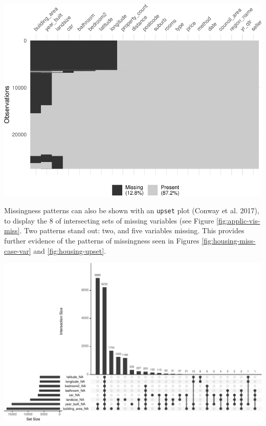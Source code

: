 \documentclass[]{article}
\let\origfigure\figure
\let\endorigfigure\endfigure
\renewenvironment{figure}[1][2] {
    \expandafter\origfigure\expandafter[H]
} {
    \endorigfigure
}
\theoremstyle{definition}
\theoremstyle{definition}
\theoremstyle{definition}
\theoremstyle{remark}
\begin{document}
\begin{figure}

{\centering \includegraphics[width=0.85\linewidth]{tidy-missing-data-paper_files/figure-latex/applic-vis-miss-1} 

}

\caption{Heatmap of clustered missingness for the housing data. Three groups of missingness are apparent, at the top for building area to longitude, the middle for building area and year built, at the end for building area, year built, and landsize. There is some structure in the missings.}\label{fig:applic-vis-miss}
\end{figure}

Missingness patterns can also be shown with an \texttt{upset} plot
(Conway et al. 2017), to display the 8 of intersecting sets of missing
variables (see Figure \ref{fig:applic-vis-miss}. Two patterns stand out:
two, and five variables missing. This provides further evidence of the
patterns of missingness seen in Figures \ref{fig:housing-miss-case-var}
and \ref{fig:housing-upset}.

\begin{figure}

{\centering \includegraphics[width=1\linewidth]{tidy-missing-data-paper_files/figure-latex/housing-upset-1} 

}

\caption{An upset plot of eight sets of missingness in the housing data. Two missingness patterns are clear, year built and building area, and lattitude through to building area.}\label{fig:housing-upset}
\end{figure}
\end{document}
